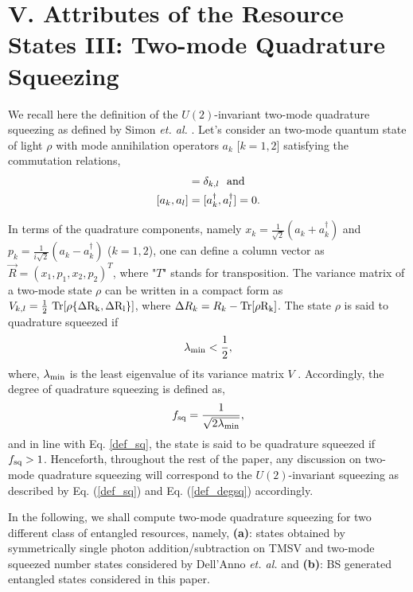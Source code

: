\documentclass[letter,scriptaddress,twocolumn, prl,showkeys]{revtex4}
\begin{document}
\section*{V. Attributes of the Resource States III: Two-mode Quadrature Squeezing}

We recall here the definition of the $U(2)$-invariant two-mode quadrature squeezing as defined by Simon \emph{et. al.} \cite{qs_simon}.
Let's consider an two-mode quantum state of light $\rho$ with mode annihilation operators $a_{k}$ [$k=1,2$] satisfying the commutation relations,
\begin{align}
[a_{k},a^{\dagger}_{l}]&=\delta_{k,l}~~\rm{and} \nonumber \\
[a_{k},a_{l}]&=[a_{k}^{\dagger},a_{l}^{\dagger}]=0 .
\end{align}

In terms of the quadrature components, namely $x_{k}=\frac{1}{\sqrt{2}}(a_{k}+a^{\dagger}_{k})$ and $p_{k}=\frac{1}{i\sqrt{2}}(a_{k}-a^{\dagger}_{k})$ ($k=1,2$), one can define a column vector as $\overrightarrow{R}=(x_{1},p_{1},x_{2},p_{2})^{T}$, where "$T$" stands for transposition.
The variance matrix of a two-mode state $\rho$ can be written in a compact form as $V_{k,l}=\frac{1}{2}~\rm{Tr}[\rho\lbrace \Delta R_{k},\Delta R_{l}\rbrace]$, where $\Delta R_{k}=R_{k}-\rm{Tr}[\rho R_{k}]$.
The state $\rho$ is said to quadrature squeezed if
\begin{equation}
\lambda_{\rm{min}}<\frac{1}{2},
\label{def_sq}
\end{equation}
where, $\lambda_{\rm{min}}$ is the least eigenvalue of its variance matrix $V$ \cite{qs_simon}. 
Accordingly, the degree of quadrature squeezing is defined as,
\begin{equation}
f_{\rm{sq}}=\frac{1}{\sqrt{2\lambda_{\rm{min}}}} ,
\label{def_degsq}
\end{equation}
and in line with Eq. \ref{def_sq}, the state is said to be quadrature squeezed if $f_{\rm{sq}}>1$.
Henceforth, throughout the rest of the paper, any discussion on two-mode quadrature squeezing will correspond to the $U(2)$-invariant squeezing as described by Eq. (\ref{def_sq}) and Eq. (\ref{def_degsq}) accordingly.

In the following, we shall compute two-mode quadrature squeezing for two different class of entangled resources, namely, {\bf (a)}: states obtained by symmetrically single photon addition/subtraction on TMSV and two-mode squeezed number states considered by Dell'Anno {\em et. al.} \cite{tp_illuminati} and {\bf (b)}: BS generated entangled states considered in this paper.
\end{document}
